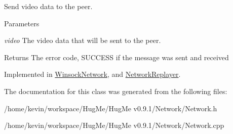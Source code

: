 Send video data to the peer. 


\begin{DoxyParams}{Parameters}
\item[{\em video}]The video data that will be sent to the peer. \end{DoxyParams}
\begin{DoxyReturn}{Returns}
The error code, SUCCESS if the message was sent and received 
\end{DoxyReturn}


Implemented in \hyperlink{classWinsockNetwork_a36362dbaa70fbe00dd48fded21464888}{WinsockNetwork}, and \hyperlink{classNetworkReplayer_ab7f69701316a3387da91d2146ea97b5e}{NetworkReplayer}.



The documentation for this class was generated from the following files:\begin{DoxyCompactItemize}
\item 
/home/kevin/workspace/HugMe/HugMe v0.9.1/Network/Network.h\item 
/home/kevin/workspace/HugMe/HugMe v0.9.1/Network/Network.cpp\end{DoxyCompactItemize}
